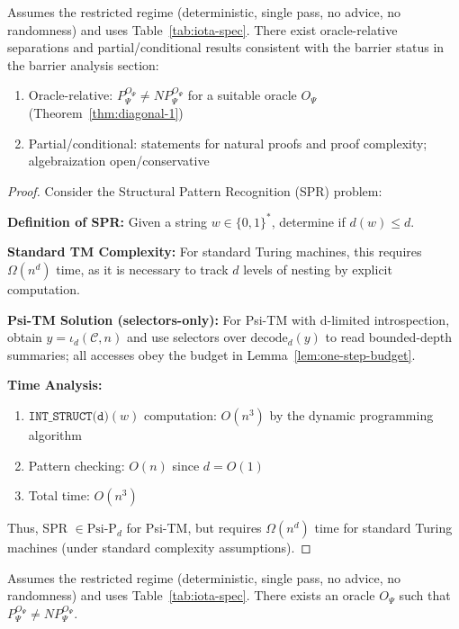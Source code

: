   \begin{theorem}
  Assumes the restricted regime (deterministic, single pass, no advice, no randomness) and uses Table~\ref{tab:iota-spec}.
  There exist oracle-relative separations and partial/conditional results consistent with the barrier status in the barrier analysis section:
  \begin{enumerate}
\item Oracle-relative: $P^{O_\Psi}_\Psi \neq NP^{O_\Psi}_\Psi$ for a suitable oracle $O_\Psi$ (Theorem~\ref{thm:diagonal-1})
  \item Partial/conditional: statements for natural proofs and proof complexity; algebraization open/conservative
  \end{enumerate}
  \end{theorem}
  
  \begin{proof}
  Consider the Structural Pattern Recognition (SPR) problem:
  
  \textbf{Definition of SPR:} 
  Given a string $w \in \{0,1\}^*$, determine if $d(w) \leq d$.
  
  \textbf{Standard TM Complexity:}
  For standard Turing machines, this requires $\Omega(n^d)$ time, as it is necessary to track $d$ levels of nesting by explicit computation.
  
  \textbf{Psi-TM Solution (selectors-only):}
  For Psi-TM with d-limited introspection, obtain $y=\iota_d(\mathcal{C},n)$ and use selectors over $\mathrm{decode}_d(y)$ to read bounded-depth summaries; all accesses obey the budget in Lemma~\ref{lem:one-step-budget}.
  
  \textbf{Time Analysis:}
  \begin{enumerate}
  \item $\texttt{INT\_STRUCT(d)}(w)$ computation: $O(n^3)$ by the dynamic programming algorithm
  \item Pattern checking: $O(n)$ since $d = O(1)$
  \item Total time: $O(n^3)$
  \end{enumerate}
  
  Thus, SPR $\in \text{Psi-P}_d$ for Psi-TM, but requires $\Omega(n^d)$ time for standard Turing machines (under standard complexity assumptions).
  \end{proof}
  
  \begin{theorem}
  \label{thm:diagonal-1}
  Assumes the restricted regime (deterministic, single pass, no advice, no randomness) and uses Table~\ref{tab:iota-spec}.
  There exists an oracle $O_\Psi$ such that $P^{O_\Psi}_\Psi \neq NP^{O_\Psi}_\Psi$.
  \end{theorem}
  
